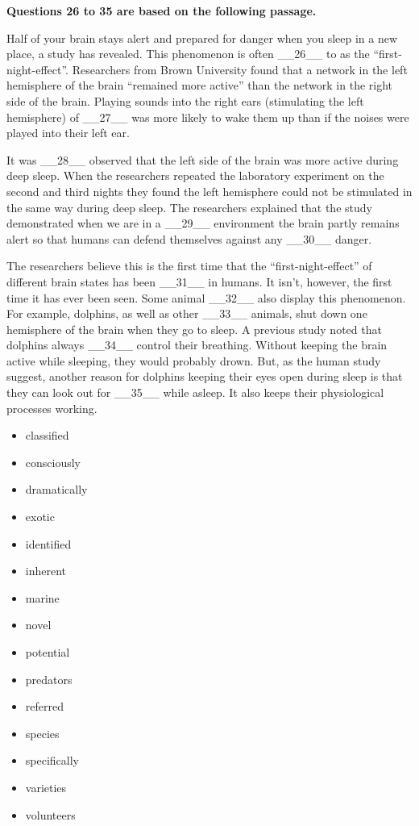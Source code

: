 \documentclass[UTF8,11pt]{ctexart}
\begin{document}
\textbf{Questions 26 to 35 are based on the following passage.}


Half of your brain stays alert and prepared for danger when you sleep in a new place, a study has revealed. This phenomenon is often \_\_26\_\_ to as the “first-night-effect”. Researchers from Brown University found that a network in the left hemisphere of the brain “remained more active” than the network in the right side of the brain. Playing sounds into the right ears (stimulating the left hemisphere) of \_\_27\_\_ was more likely to wake them up than if the noises were played into their left ear.


It was \_\_28\_\_ observed that the left side of the brain was more active during deep sleep. When the researchers repeated the laboratory experiment on the second and third nights they found the left hemisphere could not be stimulated in the same way during deep sleep. The researchers explained that the study demonstrated when we are in a \_\_29\_\_ environment the brain partly remains alert so that humans can defend themselves against any \_\_30\_\_ danger.


The researchers believe this is the first time that the “first-night-effect” of different brain states has been \_\_31\_\_ in humans. It isn’t, however, the first time it has ever been seen. Some animal \_\_32\_\_ also display this phenomenon. For example, dolphins, as well as other \_\_33\_\_ animals, shut down one hemisphere of the brain when they go to sleep. A previous study noted that dolphins always \_\_34\_\_ control their breathing. Without keeping the brain active while sleeping, they would probably drown. But, as the human study suggest, another reason for dolphins keeping their eyes open during sleep is that they can look out for \_\_35\_\_ while asleep. It also keeps their physiological processes working.


\begin{itemize}[leftmargin=2em,itemsep=.2em,topsep=.4em]\item[A.] classified
\item[B.] consciously
\item[C.] dramatically
\item[D.] exotic
\item[E.] identified
\item[F.] inherent
\item[G.] marine
\item[H.] novel
\item[I.] potential
\item[J.] predators
\item[K.] referred
\item[L.] species
\item[M.] specifically
\item[N.] varieties
\item[O.] volunteers
\end{itemize}
\end{document}

